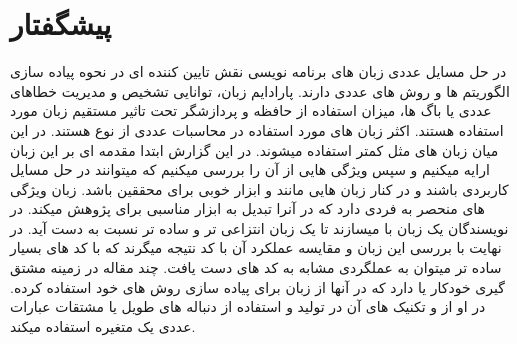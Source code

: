 \chapter*{پیشگفتار}
\thispagestyle{empty}
 در حل مسایل عددی زبان های برنامه نویسی نقش تایین کننده ای در نحوه پیاده سازی الگوریتم ها و روش های عددی دارند. پارادایم زبان، توانایی تشخیص و مدیریت خطاهای عددی یا باگ ها، میزان استفاده از حافظه و پردازشگر تحت تاثیر مستقیم زبان مورد استفاده هستند.
اکثر زبان های مورد استفاده در محاسبات عددی از نوع 
 هستند. در این میان زبان های 
 مثل 
 کمتر استفاده میشوند. در این گزارش ابتدا مقدمه ای بر این زبان ارایه میکنیم و سپس ویژگی هایی از آن را بررسی میکنیم که میتوانند در حل مسایل کاربردی باشند و در کنار
زبان هایی مانند 
و
 ابزار خوبی برای محققین باشد.
زبان
ویژگی های منحصر به فردی دارد که در آنرا تبدیل به ابزار مناسبی برای پژوهش میکند.  
در
\cite{RefAHACwMG}
نویسندگان یک زبان
با
میسازند تا یک زبان انتزاعی تر و ساده تر نسبت 
به دست آید. در نهایت با بررسی این زبان و مقایسه عملکرد آن با کد 
نتیجه میگرند که با کد های بسیار ساده تر میتوان به عملگردی مشابه به کد های 
دست یافت.
چند مقاله در زمینه مشتق گیری خودکار یا
دارد که در آنها از زبان
برای پیاده سازی روش های خود استفاده کرده.  در 
\cite{RefOPFGP}
او از
و تکنیک های آن در تولید و استفاده از دنباله های طویل یا
مشتقات عبارات عددی یک متغیره استفاده میکند.

